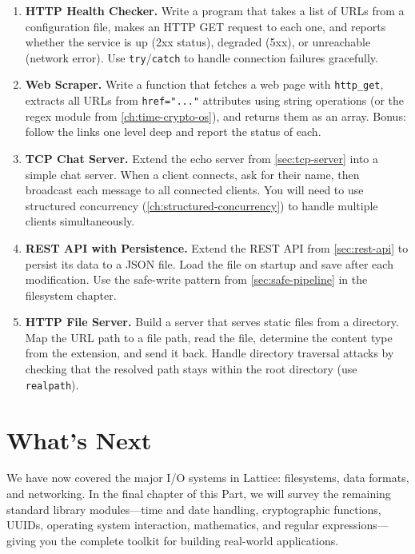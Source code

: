 \begin{enumerate}
    \item \textbf{HTTP Health Checker.} Write a program that takes a list of
    URLs from a configuration file, makes an HTTP GET request to each one,
    and reports whether the service is up (2xx status), degraded (5xx), or
    unreachable (network error). Use \lstinline|try|/\lstinline|catch| to
    handle connection failures gracefully.

    \item \textbf{Web Scraper.} Write a function that fetches a web page
    with \lstinline|http_get|, extracts all URLs from \texttt{href="..."}
    attributes using string operations (or the regex module from
    \cref{ch:time-crypto-os}), and returns them as an array. Bonus: follow
    the links one level deep and report the status of each.

    \item \textbf{TCP Chat Server.} Extend the echo server from
    \cref{sec:tcp-server} into a simple chat server. When a client connects,
    ask for their name, then broadcast each message to all connected clients.
    You will need to use structured concurrency (\cref{ch:structured-concurrency})
    to handle multiple clients simultaneously.

    \item \textbf{REST API with Persistence.} Extend the REST API from
    \cref{sec:rest-api} to persist its data to a JSON file. Load the file
    on startup and save after each modification. Use the safe-write pattern
    from \cref{sec:safe-pipeline} in the filesystem chapter.

    \item \textbf{HTTP File Server.} Build a server that serves static
    files from a directory. Map the URL path to a file path, read the file,
    determine the content type from the extension, and send it back. Handle
    directory traversal attacks by checking that the resolved path stays
    within the root directory (use \lstinline|realpath|).
\end{enumerate}

\section*{What's Next}\label{sec:networking-next}

We have now covered the major I/O systems in Lattice: filesystems, data
formats, and networking. In the final chapter of this Part, we will survey the
remaining standard library modules---time and date handling, cryptographic
functions, UUIDs, operating system interaction, mathematics, and regular
expressions---giving you the complete toolkit for building real-world
applications.
